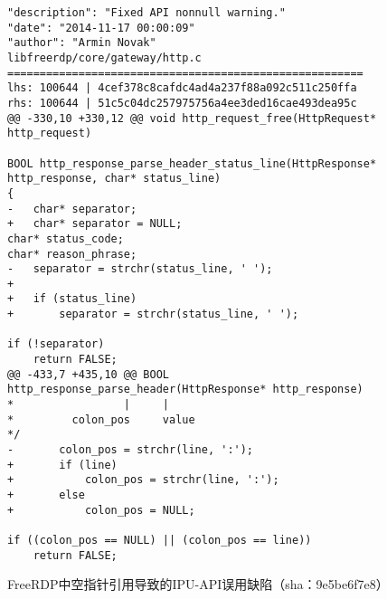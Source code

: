 \begin{figure}[t]
	\centering
\begin{lstlisting}
"description": "Fixed API nonnull warning."
"date": "2014-11-17 00:00:09"
"author": "Armin Novak"
libfreerdp/core/gateway/http.c
=======================================================
lhs: 100644 | 4cef378c8cafdc4ad4a237f88a092c511c250ffa
rhs: 100644 | 51c5c04dc257975756a4ee3ded16cae493dea95c
@@ -330,10 +330,12 @@ void http_request_free(HttpRequest* http_request)

BOOL http_response_parse_header_status_line(HttpResponse* http_response, char* status_line)
{
-	char* separator;
+	char* separator = NULL;
char* status_code;
char* reason_phrase;
-	separator = strchr(status_line, ' ');
+
+	if (status_line)
+		separator = strchr(status_line, ' ');

if (!separator)
	return FALSE;
@@ -433,7 +435,10 @@ BOOL http_response_parse_header(HttpResponse* http_response)
*                 |     |
*         colon_pos     value
*/
-		colon_pos = strchr(line, ':');
+		if (line)
+			colon_pos = strchr(line, ':');
+		else
+			colon_pos = NULL;

if ((colon_pos == NULL) || (colon_pos == line))
	return FALSE;

\end{lstlisting}
	\caption{
	FreeRDP中空指针引用导致的IPU-API误用缺陷（sha：9e5be6f7e8）
	}
	\label{fig:2-3-ipu-1}
\end{figure}